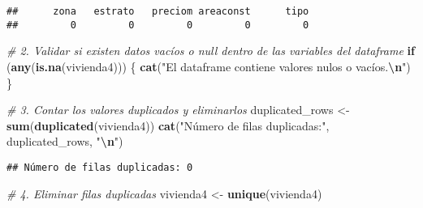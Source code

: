\documentclass[
]{article}
\newenvironment{Shaded}{\begin{snugshade}}{\end{snugshade}}
\newcommand{\CommentTok}[1]{\textcolor[rgb]{0.56,0.35,0.01}{\textit{#1}}}
\newcommand{\ControlFlowTok}[1]{\textcolor[rgb]{0.13,0.29,0.53}{\textbf{#1}}}
\newcommand{\FunctionTok}[1]{\textcolor[rgb]{0.13,0.29,0.53}{\textbf{#1}}}
\newcommand{\NormalTok}[1]{#1}
\newcommand{\OtherTok}[1]{\textcolor[rgb]{0.56,0.35,0.01}{#1}}
\newcommand{\SpecialCharTok}[1]{\textcolor[rgb]{0.81,0.36,0.00}{\textbf{#1}}}
\newcommand{\StringTok}[1]{\textcolor[rgb]{0.31,0.60,0.02}{#1}}
\begin{document}
\begin{verbatim}
##      zona   estrato   preciom areaconst      tipo 
##         0         0         0         0         0
\end{verbatim}

\begin{Shaded}
\begin{Highlighting}[]
\CommentTok{\# 2. Validar si existen datos vacíos o null dentro de las variables del dataframe}
\ControlFlowTok{if}\NormalTok{ (}\FunctionTok{any}\NormalTok{(}\FunctionTok{is.na}\NormalTok{(vivienda4))) \{}
  \FunctionTok{cat}\NormalTok{(}\StringTok{"El dataframe contiene valores nulos o vacíos.}\SpecialCharTok{\textbackslash{}n}\StringTok{"}\NormalTok{)}
\NormalTok{\}}
\end{Highlighting}
\end{Shaded}

\begin{Shaded}
\begin{Highlighting}[]
\CommentTok{\# 3. Contar los valores duplicados y eliminarlos}
\NormalTok{duplicated\_rows }\OtherTok{\textless{}{-}} \FunctionTok{sum}\NormalTok{(}\FunctionTok{duplicated}\NormalTok{(vivienda4))}
\FunctionTok{cat}\NormalTok{(}\StringTok{"Número de filas duplicadas:"}\NormalTok{, duplicated\_rows, }\StringTok{"}\SpecialCharTok{\textbackslash{}n}\StringTok{"}\NormalTok{)}
\end{Highlighting}
\end{Shaded}

\begin{verbatim}
## Número de filas duplicadas: 0
\end{verbatim}

\begin{Shaded}
\begin{Highlighting}[]
\CommentTok{\# 4. Eliminar filas duplicadas}
\NormalTok{vivienda4 }\OtherTok{\textless{}{-}} \FunctionTok{unique}\NormalTok{(vivienda4)}
\end{Highlighting}
\end{Shaded}

\begin{Shaded}
\end{Shaded}
\end{document}

